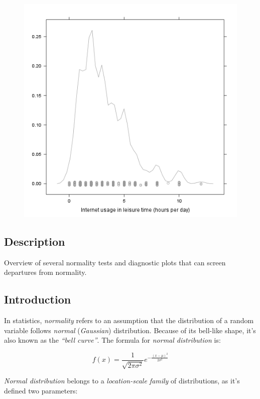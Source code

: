 \documentclass[]{article}
\makeatletter
\def\maxwidth{\ifdim\Gin@nat@width>\linewidth\linewidth
\else\Gin@nat@width\fi}
\let\Oldincludegraphics\includegraphics
\renewcommand{\includegraphics}[1]{\Oldincludegraphics[width=\maxwidth]{#1}}
\makeatother
\begin{document}
\begin{figure}[htbp]
\centering
\includegraphics{2566e535c6619ca87dce39c72a1bd2e1.png}
\caption{}
\end{figure}

\subsection{Description}

Overview of several normality tests and diagnostic plots that can screen
departures from normality.

\subsection{Introduction}

In statistics, \emph{normality} refers to an assumption that the
distribution of a random variable follows \emph{normal}
(\emph{Gaussian}) distribution. Because of its bell-like shape, it's
also known as the \emph{``bell curve''}. The formula for \emph{normal
distribution} is:

\[f(x) = \frac{1}{\sqrt{2\pi{}\sigma{}^2}} e^{-\frac{(x-\mu{})^2}{2\sigma{}^2}}\]

\emph{Normal distribution} belongs to a \emph{location-scale family} of
distributions, as it's defined two parameters:
\end{document}
